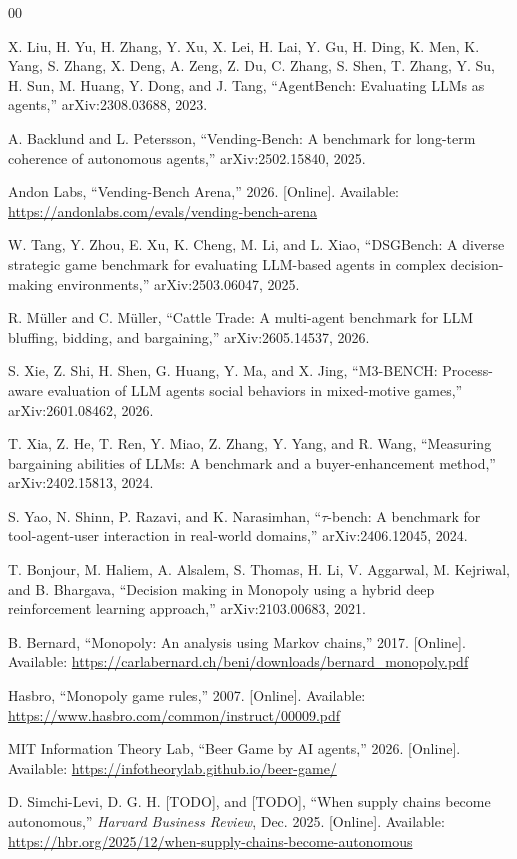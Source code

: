 \documentclass[conference]{IEEEtran}
\begin{document}
\begingroup
\raggedright
\begin{thebibliography}{00}

X. Liu, H. Yu, H. Zhang, Y. Xu, X. Lei, H. Lai, Y. Gu, H. Ding, K. Men, K. Yang, S. Zhang, X. Deng, A. Zeng, Z. Du, C. Zhang, S. Shen, T. Zhang, Y. Su, H. Sun, M. Huang, Y. Dong, and J. Tang, ``AgentBench: Evaluating LLMs as agents,'' arXiv:2308.03688, 2023.

A. Backlund and L. Petersson, ``Vending-Bench: A benchmark for long-term coherence of autonomous agents,'' arXiv:2502.15840, 2025.

Andon Labs, ``Vending-Bench Arena,'' 2026. [Online]. Available: \url{https://andonlabs.com/evals/vending-bench-arena}

W. Tang, Y. Zhou, E. Xu, K. Cheng, M. Li, and L. Xiao, ``DSGBench: A diverse strategic game benchmark for evaluating LLM-based agents in complex decision-making environments,'' arXiv:2503.06047, 2025.

R. M\"uller and C. M\"uller, ``Cattle Trade: A multi-agent benchmark for LLM bluffing, bidding, and bargaining,'' arXiv:2605.14537, 2026.

S. Xie, Z. Shi, H. Shen, G. Huang, Y. Ma, and X. Jing, ``M3-BENCH: Process-aware evaluation of LLM agents social behaviors in mixed-motive games,'' arXiv:2601.08462, 2026.

T. Xia, Z. He, T. Ren, Y. Miao, Z. Zhang, Y. Yang, and R. Wang, ``Measuring bargaining abilities of LLMs: A benchmark and a buyer-enhancement method,'' arXiv:2402.15813, 2024.

S. Yao, N. Shinn, P. Razavi, and K. Narasimhan, ``\(\tau\)-bench: A benchmark for tool-agent-user interaction in real-world domains,'' arXiv:2406.12045, 2024.

T. Bonjour, M. Haliem, A. Alsalem, S. Thomas, H. Li, V. Aggarwal, M. Kejriwal, and B. Bhargava, ``Decision making in Monopoly using a hybrid deep reinforcement learning approach,'' arXiv:2103.00683, 2021.

B. Bernard, ``Monopoly: An analysis using Markov chains,'' 2017. [Online]. Available: \url{https://carlabernard.ch/beni/downloads/bernard_monopoly.pdf}

Hasbro, ``Monopoly game rules,'' 2007. [Online]. Available: \url{https://www.hasbro.com/common/instruct/00009.pdf}

MIT Information Theory Lab, ``Beer Game by AI agents,'' 2026. [Online]. Available: \url{https://infotheorylab.github.io/beer-game/}

D. Simchi-Levi, D. G. H. [TODO], and [TODO], ``When supply chains become autonomous,'' \textit{Harvard Business Review}, Dec. 2025. [Online]. Available: \url{https://hbr.org/2025/12/when-supply-chains-become-autonomous}

\end{thebibliography}
\endgroup
\end{document}
